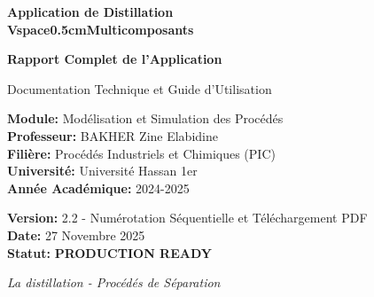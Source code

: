 \documentclass[11pt,a4paper]{article}
\begin{document}
\begin{titlepage}
    \centering
    \vspace*{1.5cm}

    {\Huge\bfseries Application de Distillation\\Vspace{0.5cm}Multicomposants\par}
    \vspace{1cm}

    {\Large\bfseries Rapport Complet de l'Application\par}
    \vspace{0.5cm}
    {\large Documentation Technique et Guide d'Utilisation\par}

    \vspace{2cm}

    \begin{tcolorbox}[colback=lightblue!10,colframe=darkblue,title=Informations du Projet]
        \textbf{Module:} Modélisation et Simulation des Procédés\\[0.3cm]
        \textbf{Professeur:} BAKHER Zine Elabidine\\[0.3cm]
        \textbf{Filière:} Procédés Industriels et Chimiques (PIC)\\[0.3cm]
        \textbf{Université:} Université Hassan 1er\\[0.3cm]
        \textbf{Année Académique:} 2024-2025
    \end{tcolorbox}

    \vspace{2cm}

    \begin{tcolorbox}[colback=green!10,colframe=green!50!black,title=Version de l'Application]
        \textbf{Version:} 2.2 - Numérotation Séquentielle et Téléchargement PDF\\[0.3cm]
        \textbf{Date:} 27 Novembre 2025\\[0.3cm]
        \textbf{Statut:} \textcolor{green!70!black}{\textbf{PRODUCTION READY}}
    \end{tcolorbox}

    \vfill

    {\large \textit{La distillation - Procédés de Séparation}\par}
\end{titlepage}
\end{document}
